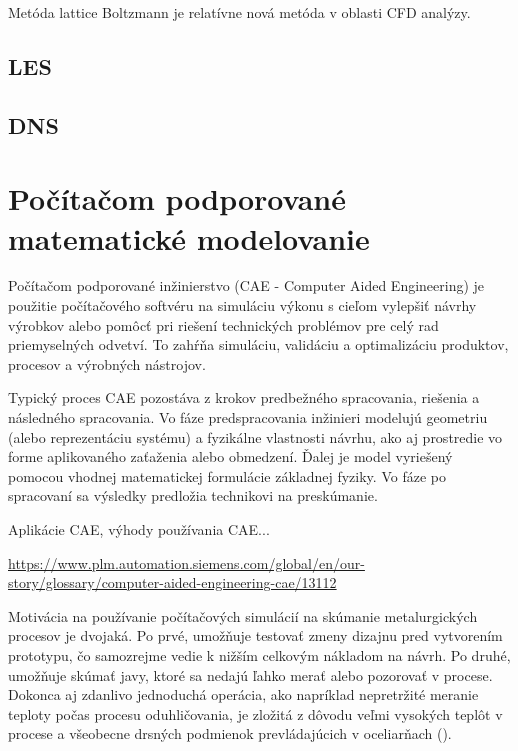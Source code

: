 \documentclass[]{tukediphc}
\begin{document}
Metóda lattice Boltzmann je relatívne nová metóda v oblasti CFD analýzy.


\citep{delbosc2015}

\subsection{LES}

\subsection{DNS}

\section{Počítačom podporované matematické modelovanie}

Počítačom podporované inžinierstvo (CAE - Computer Aided Engineering) je použitie počítačového softvéru na simuláciu výkonu s cieľom vylepšiť návrhy výrobkov alebo pomôcť pri riešení technických problémov pre celý rad priemyselných odvetví. To zahŕňa simuláciu, validáciu a optimalizáciu produktov, procesov a výrobných nástrojov.

Typický proces CAE pozostáva z krokov predbežného spracovania, riešenia a následného spracovania. Vo fáze predspracovania inžinieri modelujú geometriu (alebo reprezentáciu systému) a fyzikálne vlastnosti návrhu, ako aj prostredie vo forme aplikovaného zaťaženia alebo obmedzení. Ďalej je model vyriešený pomocou vhodnej matematickej formulácie základnej fyziky. Vo fáze po spracovaní sa výsledky predložia technikovi na preskúmanie.

Aplikácie CAE, výhody používania CAE...

\url{https://www.plm.automation.siemens.com/global/en/our-story/glossary/computer-aided-engineering-cae/13112}

Motivácia na používanie počítačových simulácií na skúmanie metalurgických procesov je dvojaká. Po prvé, umožňuje testovať zmeny dizajnu pred vytvorením prototypu, čo samozrejme vedie k nižším celkovým nákladom na návrh. Po druhé, umožňuje skúmať javy, ktoré sa nedajú ľahko merať alebo pozorovať v procese. Dokonca aj zdanlivo jednoduchá operácia, ako napríklad nepretržité meranie teploty počas procesu oduhličovania, je zložitá z dôvodu veľmi vysokých teplôt v procese a všeobecne drsných podmienok prevládajúcich v oceliarňach (\citep{Ersson2018}).
\end{document}
